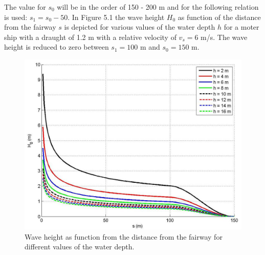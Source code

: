 The value for $s_0$ will be in the order of 150 - 200 m and for  the following relation is used: $s_1 = s_0 - 50$.
In Figure 5.1 the wave height $H_0$ as function of the distance from the fairway $s$ is depicted for various values of the water depth $h$ for a moter ship with a draught of 1.2 m with a relative velocity of $v_s = 6$ m/s.
The wave height is reduced to zero between $s_1 = 100$ m and $s_0 = 150$ m.

\begin{figure}
\includegraphics[width=\textwidth]{figures/Fig5-1.png}
\caption{Wave height as function from the distance from the fairway for different values of the water depth.}
\label{Fig5.1}
\end{figure}

